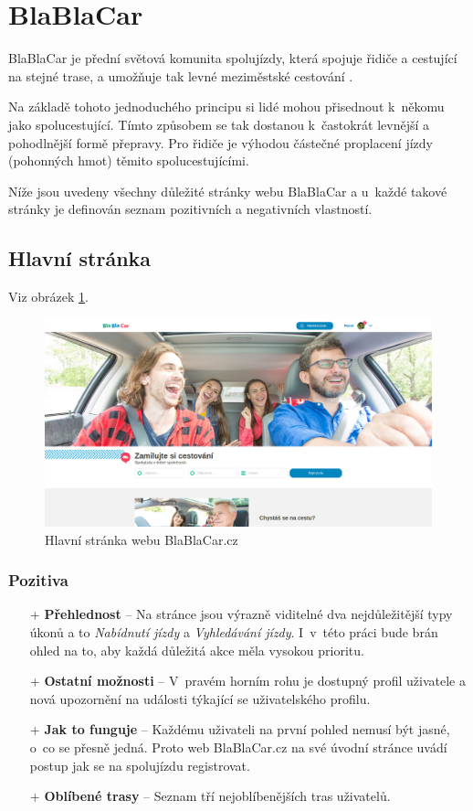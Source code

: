 \section{BlaBlaCar}
\label{analyza:blablacar}

BlaBlaCar je přední světová komunita spolujízdy, která spojuje řidiče a cestující na stejné trase, a umožňuje tak levné meziměstské cestování \cite{blablacar}.

Na základě tohoto jednoduchého principu si lidé mohou přisednout k~někomu jako spolucestující. Tímto způsobem se tak dostanou k~častokrát levnější a pohodlnější formě přepravy. Pro řidiče je výhodou částečné proplacení jízdy (pohonných hmot) těmito spolucestujícími.

Níže jsou uvedeny všechny důležité stránky webu BlaBlaCar a u~každé takové stránky je definován seznam pozitivních a negativních vlastností.

\subsection{Hlavní stránka}
Viz obrázek \ref{fig:blablacar:homepage}.
\begin{figure}[h]
    \centering
    \includegraphics[width=1.0\textwidth]{media/blablacar/homepage.png}
    \caption{Hlavní stránka webu BlaBlaCar.cz}
    \label{fig:blablacar:homepage}
\end{figure}
\subsubsection*{Pozitiva}
\begin{itemize}
    \item[+] \textbf{Přehlednost} -- Na stránce jsou výrazně viditelné dva nejdůležitější typy úkonů a to \textit{Nabídnutí jízdy} a \textit{Vyhledávání jízdy}. I~v~této práci bude brán ohled na to, aby každá důležitá akce měla vysokou prioritu.
    \item[+] \textbf{Ostatní možnosti} -- V~pravém horním rohu je dostupný profil uživatele a nová upozornění na události týkající se uživatelského profilu.
    \item[+] \textbf{Jak to funguje} -- Každému uživateli na první pohled nemusí být jasné, o~co se přesně jedná. Proto web BlaBlaCar.cz na své úvodní stránce uvádí postup jak se na spolujízdu registrovat.
    \item[+] \textbf{Oblíbené trasy} -- Seznam tří nejoblíbenějších tras uživatelů.
\end{itemize}
